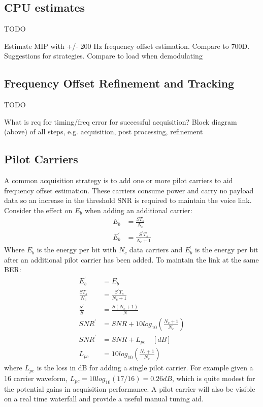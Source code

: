 \documentclass{article}
\begin{document}
\subsection{CPU estimates}

TODO 

Estimate MIP with +/- 200 Hz frequency offset estimation. Compare to 700D.  Suggestions for strategies.
Compare to load when demodulating

\subsection{Frequency Offset Refinement and Tracking}

TODO

What is req for timing/freq error for successful acquisition?
Block diagram (above) of all steps, e.g. acquisition, post processing, refinement

\subsection{Pilot Carriers}

A common acquisition strategy is to add one or more pilot carriers to aid frequency offset estimation. These carriers consume power and carry no payload data so an increase in the threshold SNR is required to maintain the voice link. Consider the effect on $E_b$ when adding an additional carrier:
\begin{equation}
\begin{split}
E_b &= \frac{ST_s}{N_c} \\
E^\prime_b &= \frac{S^\prime T_s}{N_c+1}
\end{split}
\end{equation}
Where $E_b$ is the energy per bit with $N_c$ data carriers and $E^\prime_b$ is the energy per bit after an additional pilot carrier has been added.  To maintain the link at the same BER:
\begin{equation}
\begin{split}
E^\prime_b &= E_b \\
\frac{S T_s}{N_c} &= \frac{S^\prime T_s} {N_c+1} \\
\frac{S^\prime}{S} &= \frac{S (N_c+1)}{N} \\
SNR^\prime &= SNR + 10log_{10}\left(\frac{N_c+1}{N_c}\right)  \\
SNR^\prime &= SNR + L_{pc}  \quad [\si{dB}] \\
L_{pc} &= 10log_{10}\left(\frac{N_c+1}{N_c}\right) 
\end{split}
\end{equation}
where $L_{pc}$ is the loss in dB for adding a single pilot carrier.  For example given a 16 carrier waveform, $L_{pc}=10log_{10}(17/16)=0.26 \si{dB}$, which is quite modest for the potential gains in acquisition performance.  A pilot carrier will also be visible on a real time waterfall and provide a useful manual tuning aid.
\end{document}
